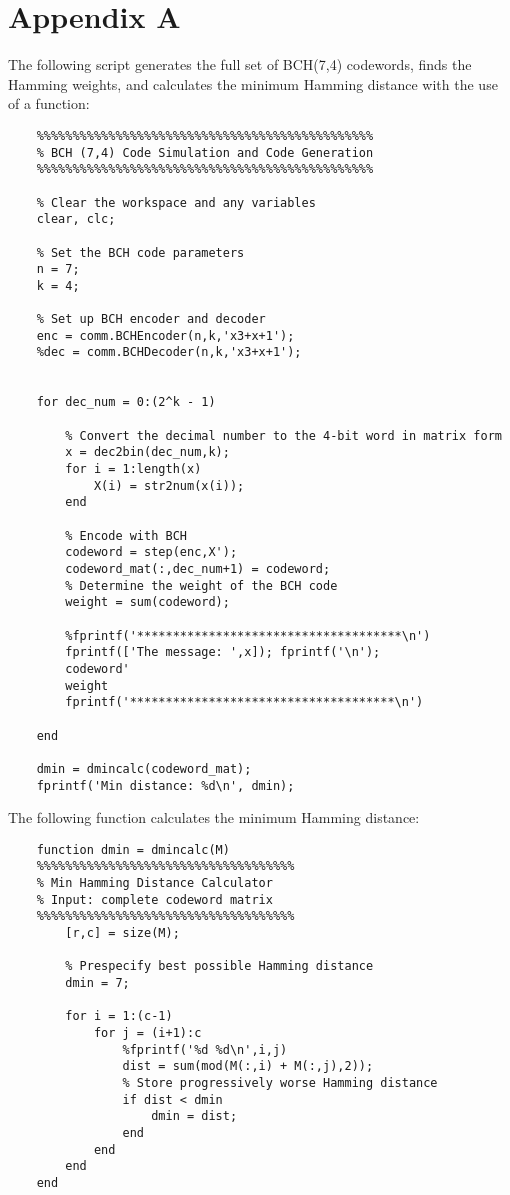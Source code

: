 \documentclass{article}
\begin{document}
\section{Appendix A}
The following script generates the full set of BCH(7,4) codewords, finds the Hamming weights, and calculates the minimum Hamming distance with the use of a function:
\begin{lstlisting}
	%%%%%%%%%%%%%%%%%%%%%%%%%%%%%%%%%%%%%%%%%%%%%%%
	% BCH (7,4) Code Simulation and Code Generation
	%%%%%%%%%%%%%%%%%%%%%%%%%%%%%%%%%%%%%%%%%%%%%%%
	
	% Clear the workspace and any variables
	clear, clc;
	
	% Set the BCH code parameters
	n = 7;
	k = 4;
	
	% Set up BCH encoder and decoder
	enc = comm.BCHEncoder(n,k,'x3+x+1');
	%dec = comm.BCHDecoder(n,k,'x3+x+1'); 
	
	
	for dec_num = 0:(2^k - 1)
	
		% Convert the decimal number to the 4-bit word in matrix form
		x = dec2bin(dec_num,k);
		for i = 1:length(x)
			X(i) = str2num(x(i));
		end
	
		% Encode with BCH
		codeword = step(enc,X');
		codeword_mat(:,dec_num+1) = codeword;
		% Determine the weight of the BCH code
		weight = sum(codeword);
	
		%fprintf('*************************************\n')
		fprintf(['The message: ',x]); fprintf('\n');
		codeword'
		weight
		fprintf('*************************************\n')
	
	end
	
	dmin = dmincalc(codeword_mat);
	fprintf('Min distance: %d\n', dmin);
\end{lstlisting}
\newpage

The following function calculates the minimum Hamming distance:
\begin{lstlisting}
	function dmin = dmincalc(M)
	%%%%%%%%%%%%%%%%%%%%%%%%%%%%%%%%%%%%
	% Min Hamming Distance Calculator
	% Input: complete codeword matrix
	%%%%%%%%%%%%%%%%%%%%%%%%%%%%%%%%%%%%
		[r,c] = size(M);
	
		% Prespecify best possible Hamming distance
		dmin = 7;
	
		for i = 1:(c-1)
			for j = (i+1):c
				%fprintf('%d %d\n',i,j)
				dist = sum(mod(M(:,i) + M(:,j),2));
				% Store progressively worse Hamming distance
				if dist < dmin
					dmin = dist;
				end
			end
		end
	end
\end{lstlisting}
\end{document}

